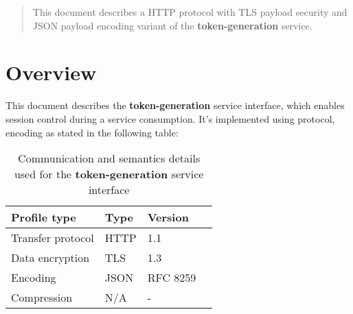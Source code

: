 \documentclass[a4paper]{arrowhead}
\begin{document}
\ArrowheadDate{\today}
\ArrowheadSetup

\begin{center}
  \vspace*{1cm}
  \huge{\arrowtitle}

  \vspace*{0.2cm}
  \LARGE{\arrowtype}
  \vspace*{1cm}
\end{center}

  \vspace*{\fill}


  \vspace*{1cm}
  \vspace*{\fill}

  \begin{abstract}
    This document describes a HTTP protocol with TLS payload
    security and JSON payload encoding variant of the \textbf{token-generation} service.
  \end{abstract}
  \vspace*{1cm}

\newpage

\tableofcontents
\newpage

\section{Overview}
\label{sec:overview}

This document describes the \textbf{token-generation} service interface, which enables session control during a service consumption. It's implemented using protocol, encoding as stated in the following table:

\begin{table}[ht!]
  \centering
  \begin{tabular}{|l|l|l|l|}
    \rowcolor{gray!33} Profile type & Type & Version \\ \hline
    Transfer protocol & HTTP & 1.1 \\ \hline
    Data encryption & TLS & 1.3 \\ \hline
    Encoding & JSON & RFC 8259 \cite{rfc8259} \\ \hline
    Compression & N/A & - \\ \hline
  \end{tabular}
  \caption{Communication and semantics details used for the \textbf{token-generation}
    service interface}
  \label{tab:comunication_semantics_profile}
\end{table}
\end{document}
